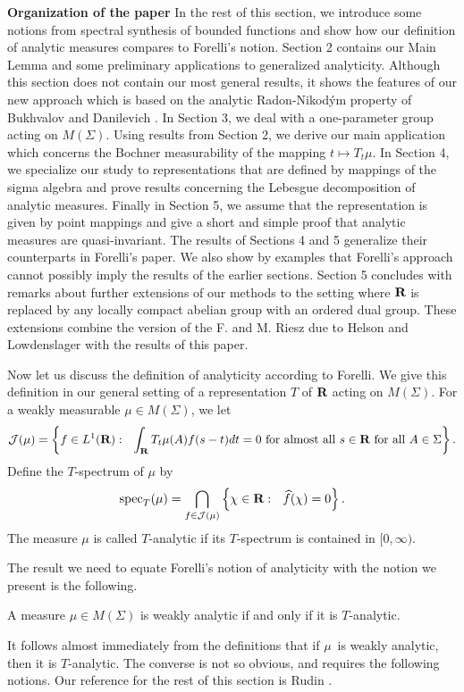 \bigskip
\noindent
{\bf Organization of the paper} 
In the rest of this section, we introduce some
notions from spectral synthesis of bounded functions and
show how our definition of analytic measures compares to
Forelli's notion.  
Section 2 contains our Main Lemma and some preliminary applications
to generalized analyticity.
Although this section does not contain our most general results,
it shows the features of our new approach which 
is based on 
the analytic Radon-Nikod\' ym property of 
Bukhvalov and Danilevich \cite{bd}.  
In Section 3, we deal with a one-parameter
group acting on $M(\Sigma)$. 
Using results from Section 2, we derive 
our main application which concerns the Bochner measurability
of the mapping $t\mapsto T_t\mu$.  
In Section 4, we specialize our study 
to representations that are defined by mappings of the sigma 
algebra and prove results concerning the 
Lebesgue decomposition of analytic measures. 
Finally in Section 5, we assume that the representation
is given by point mappings 
and give a short and simple proof
that analytic measures are
quasi-invariant.  The results of Sections 4 and 5 generalize their
counterparts in 
Forelli's paper.  
We also show by examples that Forelli's
approach cannot possibly imply the results of the earlier sections.
Section 5 concludes with remarks about further extensions of
our methods to the setting where $\R$ is replaced by any
locally compact abelian group with an ordered dual group.
These extensions combine the version of the F. and M. Riesz due to 
Helson and Lowdenslager \cite{hl1} with the results of this paper.

\bigskip

Now let us discuss the definition of analyticity
according to Forelli.  We give this definition
in our general setting of a representation $T$ of $\R$ acting
on $M(\Sigma)$.  For a weakly measurable $\mu\in M(\Sigma)$, we let 
$${\cal J}(\mu)=
  \left\{f\in L^1(\R):\ \ \int_\R T_t \mu(A) f(s-t) dt =0
  \mbox{\ for almost all $s\in\R$\ for all $A\in\Sigma$}\right\}.$$
Define the $T$-spectrum of $\mu$ by
\begin{equation}
{\rm spec}_T (\mu)= \bigcap_{f\in {\cal J}(\mu)}
\left\{
\chi\in\R:\ \ \widehat{f}(\chi)=0
\right\}.
\label{specsbt}
\end{equation}
The measure $\mu$ is called $T$-analytic if its
$T$-spectrum is contained in $[0,\infty)$.

The result we need to equate Forelli's notion of analyticity with the notion
we present is the following.
\begin{cor5.7}
A measure $\mu\in M(\Sigma)$ is weakly analytic if and only if 
it is $T$-analytic.
\label{cor5.7}
\end{cor5.7}
It follows almost immediately from the definitions that if $\mu$\ is
weakly analytic, then it is $T$-analytic.  The converse is not so
obvious, and requires the following notions.  
Our reference for the rest of this section is Rudin
\cite[Chapter 7]{rudin}.

